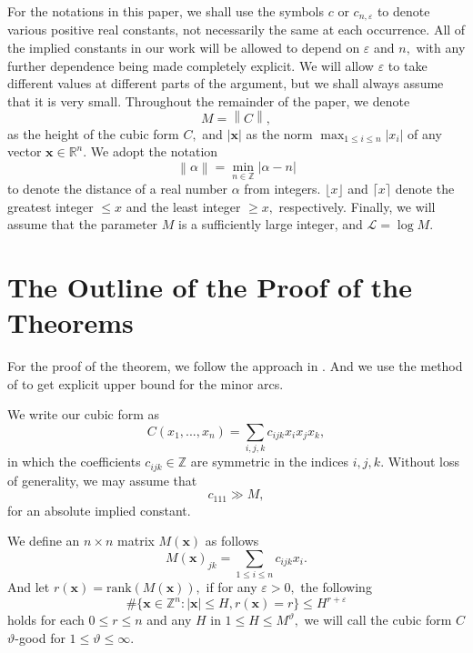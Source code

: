 \documentclass[12pt]{amsart}
\theoremstyle{definition}
\numberwithin{equation}{section}
\begin{document}
For the notations in this paper, we shall use the symbols $c$ or $c_{n, \varepsilon}$ to denote various positive real constants, not necessarily the same at each occurrence. All of the implied constants in our work will be allowed to depend on $\varepsilon$ and $n,$ with any further dependence being made completely explicit. We will allow $\varepsilon$ to take different values at different parts of the argument, but we shall always assume that it is very small. Throughout the remainder of the paper, we denote
\begin{equation*}
    M=\left\| C\right\|,
\end{equation*}
as the height of the cubic form $C,$ and $|\boldsymbol{x}|$ as the norm $\max_{1 \leq i \leq n}|x_i|$ of any vector $\boldsymbol{x} \in \mathbb{R}^n.$ We adopt the notation
\begin{equation*}
    \left\| \alpha \right\| = \min_{n \in \mathbb{Z}}|\alpha-n|
\end{equation*}
to denote the distance of a real number $\alpha$ from integers. $\lfloor x \rfloor$ and $\lceil x \rceil$ denote the greatest integer $\leq x$ and the least integer $\geq x,$ respectively.
Finally, we will assume that the parameter $M$ is a sufficiently large integer, and $\mathcal{L}=\log M.$


\section{The Outline of the Proof of the Theorems}

For the proof of the theorem, we follow the approach in \cite{browning2009least}. 
And we use the method of \cite{heath2007cubic} to get explicit upper bound for the minor arcs.

We write our cubic form as
\begin{equation}
    \label{C}
    C(x_1,...,x_n)=\sum_{i,j,k}c_{ijk}x_ix_jx_k,
\end{equation}
in which the coefficients $c_{ijk} \in \mathbb{Z}$ are symmetric in the indices $i,j,k$. Without loss of generality, we may assume that 
\begin{equation}
    \label{c111}
    c_{111} \gg M,
\end{equation}
for an absolute implied constant.

We define an $n \times n$ matrix $M(\boldsymbol{x})$ as follows
\begin{equation}
    \label{M(x)}
    M(\boldsymbol{x})_{jk}=\sum_{1 \leq i \leq n}c_{ijk}x_i.
\end{equation}
And let $r(\boldsymbol{x})=\text{rank}(M(\boldsymbol{x})),$ if for any $\varepsilon>0,$ the following
\begin{equation}
    \label{good}
    \#\{\boldsymbol{x} \in \mathbb{Z}^{n}:|\boldsymbol{x}| \leq H, r(\boldsymbol{x})=r\} \leq H^{r+\varepsilon}
\end{equation}
holds for each $0 \leq r \leq n$ and any $H$ in $1 \leq H \leq M^{\vartheta},$ we will call the cubic form $C$ $\vartheta$-good for $1 \leq \vartheta \leq \infty.$
\end{document}
